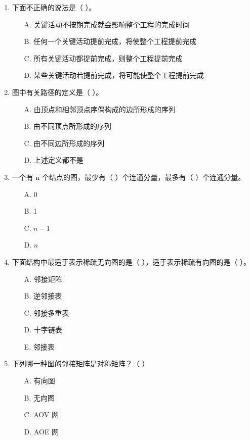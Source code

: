 \documentclass[12pt, a4paper]{article}
\begin{document}
\begin{enumerate}
    \item 下面不正确的说法是（ ）。
    \begin{enumerate}
        \item[A.] 关键活动不按期完成就会影响整个工程的完成时间
        \item[B.] 任何一个关键活动提前完成，将使整个工程提前完成
        \item[C.] 所有关键活动都提前完成，则整个工程提前完成
        \item[D.] 某些关键活动若提前完成，将可能使整个工程提前完成
    \end{enumerate}
    
    \item 图中有关路径的定义是（ ）。
    \begin{enumerate}
        \item[A.] 由顶点和相邻顶点序偶构成的边所形成的序列
        \item[B.] 由不同顶点所形成的序列
        \item[C.] 由不同边所形成的序列
        \item[D.] 上述定义都不是
    \end{enumerate}
    
    \item 一个有 n 个结点的图，最少有（ ）个连通分量，最多有（ ）个连通分量。
    \begin{enumerate}
        \item[A.] 0
        \item[B.] 1
        \item[C.] $n-1$
        \item[D.] $n$
    \end{enumerate}
    
    \item 下面结构中最适于表示稀疏无向图的是（ ），适于表示稀疏有向图的是（ ）。
    \begin{enumerate}
        \item[A.] 邻接矩阵
        \item[B.] 逆邻接表
        \item[C.] 邻接多重表
        \item[D.] 十字链表
        \item[E.] 邻接表
    \end{enumerate}
    
    \item 下列哪一种图的邻接矩阵是对称矩阵？（ ）
    \begin{enumerate}
        \item[A.] 有向图
        \item[B.] 无向图
        \item[C.] AOV 网
        \item[D.] AOE 网
    \end{enumerate}
    

\end{enumerate}
\end{document}
